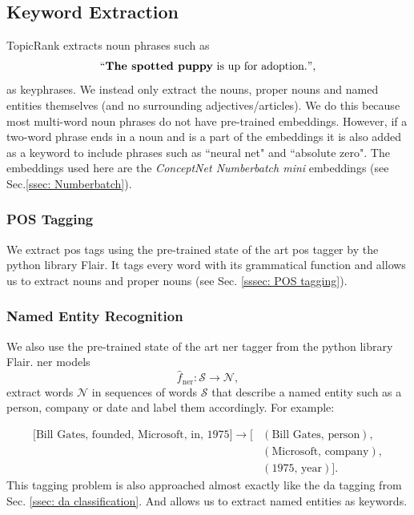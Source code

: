     \subsection{Keyword Extraction}
        TopicRank extracts noun phrases such as
        \begin{equation*}
            ``\textbf{The spotted puppy}\text{ is up for adoption.}",
        \end{equation*}
        as keyphrases. We instead only extract the nouns, proper nouns and named entities themselves (and no surrounding adjectives/articles). We do this because most multi-word noun phrases do not have pre-trained embeddings. However, if a two-word phrase ends in a noun and is a part of the embeddings it is also added as a keyword to include phrases such as ``neural net" and ``absolute zero". The embeddings used here are the \textit{ConceptNet Numberbatch mini} embeddings (see Sec.\ref{ssec: Numberbatch}).
        
        \subsubsection{POS Tagging}
            We extract \gls{pos} tags using the pre-trained state of the art \gls{pos} tagger by the python library Flair\cite{flairNLP}. It tags every word with its grammatical function and allows us to extract nouns and proper nouns (see Sec. \ref{sssec: POS tagging}).
        
        \subsubsection{Named Entity Recognition}
            We also use the pre-trained state of the art \gls{ner} tagger from the python library Flair\cite{flairNLP}.
            \Gls{ner} models
            \begin{equation}
              \hat{f}_{\text{ner}}: \mathcal{S} \rightarrow \mathcal{N},
            \end{equation} 
            extract words $\mathcal{N}$ in sequences of words $\mathcal{S}$ that describe a named entity such as a person, company or date and label them accordingly. For example:
        
        \begin{align*}
        \text{[Bill Gates, founded, Microsoft, in, 1975]} \rightarrow [& (\text{Bill Gates, person}), \\
                                                                       & (\text{Microsoft, company}), \\
                                                                       & (\text{1975, year})].
        \end{align*}
        This tagging problem is also approached almost exactly like the \gls{da} tagging from Sec. \ref{ssec: da classification}. And allows us to extract named entities as keywords.
        
